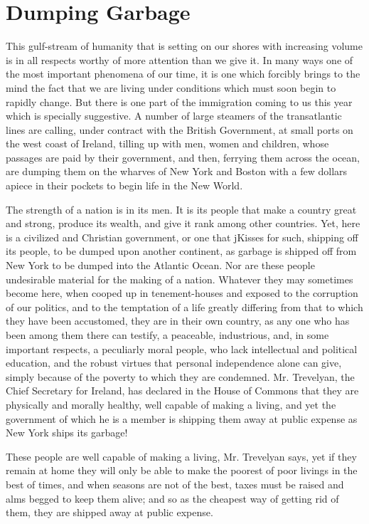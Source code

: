 \documentclass{book}
\begin{document}
\chapter{Dumping Garbage}
\label{chapter-11}
This gulf-stream of humanity that is setting on our shores with increasing volume is in all respects worthy of more attention than we give it. In many ways one of the most important phenomena of our time, it is one which forcibly brings to the mind the fact that we are living under conditions which must soon begin to rapidly change. But there is one part of the immigration coming to us this year which is specially suggestive. A number of large steamers of the transatlantic lines are calling, under contract with the British Government, at small ports on the west coast of Ireland, tilling up with men, women and children, whose passages are paid by their government, and then, ferrying them across the ocean, are dumping them on the wharves of New York and Boston with a few dollars apiece in their pockets to begin life in the New World.

The strength of a nation is in its men. It is its people that make a country great and strong, produce its wealth, and give it rank among other countries. Yet, here is a civilized and Christian government, or one that jKisses for such, shipping off its people, to be dumped upon another continent, as garbage is shipped off from New York to be dumped into the Atlantic Ocean. Nor are these people undesirable material for the making of a nation. Whatever they may sometimes become here, when cooped up in tenement-houses and exposed to the corruption of our politics, and to the temptation of a life greatly differing from that to which they have been accustomed, they are in their own country, as any one who has been among them there can testify, a peaceable, industrious, and, in some important respects, a peculiarly moral people, who lack intellectual and political education, and the robust virtues that personal independence alone can give, simply because of the poverty to which they are condemned. Mr. Trevelyan, the Chief Secretary for Ireland, has declared in the House of Commons that they are physically and morally healthy, well capable of making a living, and yet the government of which he is a member is shipping them away at public expense as New York ships its garbage!

These people are well capable of making a living, Mr. Trevelyan says, yet if they remain at home they will only be able to make the poorest of poor livings in the best of times, and when seasons are not of the best, taxes must be raised and alms begged to keep them alive; and so as the cheapest way of getting rid of them, they are shipped away at public expense.
\end{document}
